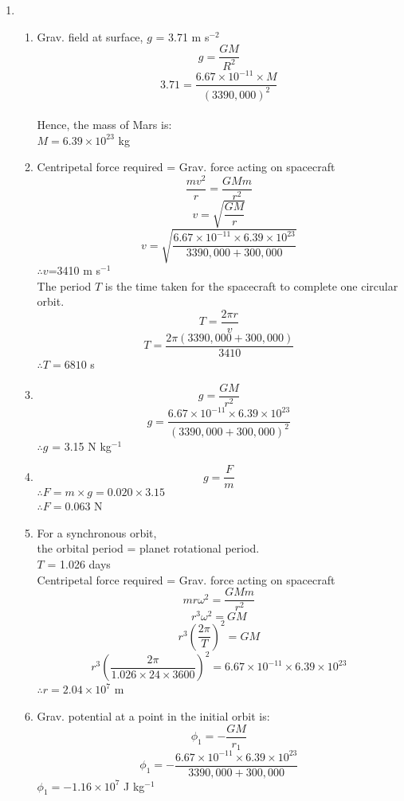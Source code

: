 \documentclass[a4paper,12pt]{article}
\begin{document}
\begin{enumerate}
\newpage %

\item 
\begin{enumerate}
\item Grav. field at surface, $g$ = 3.71 m s$^{-2}$
\[ g = \frac{GM}{R^2} \] 
\[ 3.71 = \frac{6.67 \times 10^{-11} \times M}{(3390,000)^2} \] \\
Hence, the mass of Mars is:\\
$M = 6.39 \times 10^{23}$ kg \\

\item Centripetal force required = Grav. force acting on spacecraft \\
\[ \frac{mv^2}{r}=\frac{GMm}{r^2}    \]
\[v = \sqrt{\frac{GM}{r}}    \]
\[v = \sqrt{\frac{6.67 \times 10^{-11} \times 6.39 \times 10^{23}}{3390,000+300,000}}    \]
\vspace{5pt}
$\therefore v$=3410 m s$^{-1}$ \\
The period $T$ is the time taken for the spacecraft to complete one circular orbit.\\
\[ T =\frac{2\pi r}{v}   \]
\[ T =\frac{2\pi (3390,000+300,000)}{3410}   \]
$\therefore T = 6810$ s\\

\item 
\[g=\frac{GM}{r^2}   \]
\[g=\frac{6.67 \times 10^{-11} \times 6.39 \times 10^{23}}{(3390,000+300,000)^2}   \]
$\therefore g$ = 3.15 N kg$^{-1}$

\item 
\[ g = \frac{F}{m}   \]
$\therefore F = m \times g = 0.020 \times 3.15$\\
$\therefore F = 0.063 $ N\\

\item For a synchronous orbit,\\ the orbital period = planet rotational period.\\
$T$ = 1.026 days\\
Centripetal force required = Grav. force acting on spacecraft \\
\[ mr \omega^2 =\frac{GMm}{r^2}    \]
\[r^3 \omega^2 = GM  \]
\[r^3 \left( \frac{2\pi}{T} \right)^2 = GM    \]
\[r^3 \left( \frac{2\pi}{1.026\times 24 \times 3600} \right)^2 = 6.67 \times 10^{-11} \times 6.39 \times 10^{23} \]
$\therefore r = 2.04 \times 10^7$ m\\

\item Grav. potential at a point in the initial orbit is:\\
\[\phi_1 = -\frac{GM}{r_1}  \]
\[\phi_1 = -\frac{6.67 \times 10^{-11} \times 6.39 \times 10^{23}}{3390,000+300,000} \]
$\phi_1 = -1.16 \times 10^7$ J kg$^{-1}$\\


\end{enumerate}
\end{enumerate}
\end{document}
